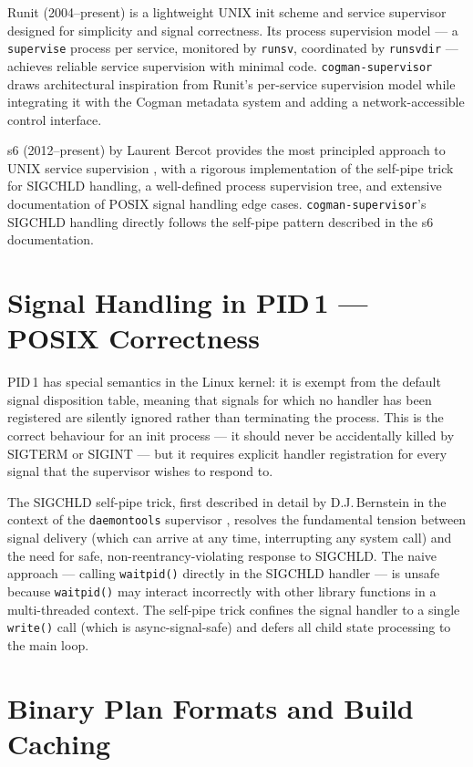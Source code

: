 \documentclass[12pt,a4paper]{report}
\begin{document}
Runit (2004--present) is a lightweight UNIX init scheme and service supervisor
designed for simplicity and signal correctness. Its process supervision model --- a
\texttt{supervise} process per service, monitored by \texttt{runsv}, coordinated
by \texttt{runsvdir} --- achieves reliable service supervision with minimal code.
\texttt{cogman-supervisor} draws architectural inspiration from Runit's per-service
supervision model while integrating it with the Cogman metadata system and adding
a network-accessible control interface.

s6 (2012--present) by Laurent Bercot provides the most principled approach to
UNIX service supervision \cite{s6}, with a rigorous implementation of the
self-pipe trick for SIGCHLD handling, a well-defined process supervision tree, and
extensive documentation of POSIX signal handling edge cases.
\texttt{cogman-supervisor}'s SIGCHLD handling directly follows the self-pipe
pattern described in the s6 documentation.

\section{Signal Handling in PID\,1 --- POSIX Correctness}

PID\,1 has special semantics in the Linux kernel: it is exempt from the default
signal disposition table, meaning that signals for which no handler has been
registered are silently ignored rather than terminating the process. This is the
correct behaviour for an init process --- it should never be accidentally killed by
SIGTERM or SIGINT --- but it requires explicit handler registration for every
signal that the supervisor wishes to respond to.

The SIGCHLD self-pipe trick, first described in detail by D.J.\,Bernstein in the
context of the \texttt{daemontools} supervisor \cite{daemontools}, resolves the
fundamental tension between signal delivery (which can arrive at any time,
interrupting any system call) and the need for safe, non-reentrancy-violating
response to SIGCHLD. The naive approach --- calling \texttt{waitpid()} directly in
the SIGCHLD handler --- is unsafe because \texttt{waitpid()} may interact
incorrectly with other library functions in a multi-threaded context. The
self-pipe trick confines the signal handler to a single \texttt{write()} call
(which is async-signal-safe) and defers all child state processing to the main
loop.

\section{Binary Plan Formats and Build Caching}
\end{document}
